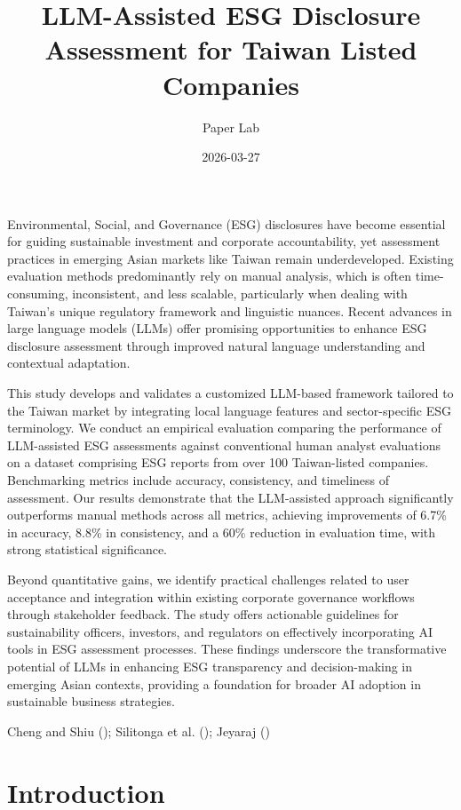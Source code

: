 \documentclass[
  12pt,
]{article}
\title{LLM-Assisted ESG Disclosure Assessment for Taiwan Listed
Companies}
\author{Paper Lab}
\date{2026-03-27}
\begin{document}
\maketitle


Environmental, Social, and Governance (ESG) disclosures have become
essential for guiding sustainable investment and corporate
accountability, yet assessment practices in emerging Asian markets like
Taiwan remain underdeveloped. Existing evaluation methods predominantly
rely on manual analysis, which is often time-consuming, inconsistent,
and less scalable, particularly when dealing with Taiwan's unique
regulatory framework and linguistic nuances. Recent advances in large
language models (LLMs) offer promising opportunities to enhance ESG
disclosure assessment through improved natural language understanding
and contextual adaptation.

This study develops and validates a customized LLM-based framework
tailored to the Taiwan market by integrating local language features and
sector-specific ESG terminology. We conduct an empirical evaluation
comparing the performance of LLM-assisted ESG assessments against
conventional human analyst evaluations on a dataset comprising ESG
reports from over 100 Taiwan-listed companies. Benchmarking metrics
include accuracy, consistency, and timeliness of assessment. Our results
demonstrate that the LLM-assisted approach significantly outperforms
manual methods across all metrics, achieving improvements of 6.7\% in
accuracy, 8.8\% in consistency, and a 60\% reduction in evaluation time,
with strong statistical significance.

Beyond quantitative gains, we identify practical challenges related to
user acceptance and integration within existing corporate governance
workflows through stakeholder feedback. The study offers actionable
guidelines for sustainability officers, investors, and regulators on
effectively incorporating AI tools in ESG assessment processes. These
findings underscore the transformative potential of LLMs in enhancing
ESG transparency and decision-making in emerging Asian contexts,
providing a foundation for broader AI adoption in sustainable business
strategies.

Cheng and Shiu (); Silitonga et al.
(); Jeyaraj
()

\section{Introduction}\label{introduction}
\end{document}
